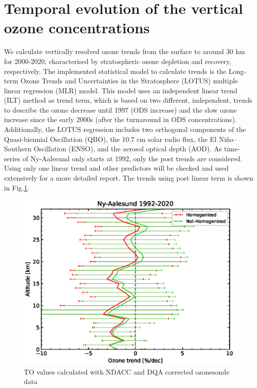 \documentclass{article}
\begin{document}
    \section{Temporal evolution of the vertical ozone concentrations}
    We calculate vertically resolved ozone trends from the surface to around 30 km for
2000-2020, characterised by stratospheric ozone depletion and recovery, respectively.
    The implemented statistical model to calculate trends is the Long-term Ozone Trends and Uncertainties
    in the Stratosphere (LOTUS) multiple linear regression (MLR) model. This model
uses an independent linear trend (ILT) method as trend term,
which is based on two different, independent, trends to describe the ozone decrease until 1997 (ODS increase) and
the slow ozone increase since the early 2000s (after the
turnaround in ODS concentrations). Additionally, the
LOTUS regression includes two orthogonal components of
the Quasi-biennial Oscillation (QBO), the 10.7 cm solar radio flux, the El Niño–Southern Oscillation (ENSO),
and the aerosol optical depth (AOD). As time-series of Ny-Aalesund only starts at 1992, only the post trends are considered.
    Using only one linear trend and other predictors will be checked and used extensively for a more detailed report.
    The trends using post linear term is shown in  Fig.\ref{fig:trend1}.

                                    \begin{figure}
        \centering
\includegraphics[width=1.2\textwidth]{post_Trend_Ny-aalesund}
    \caption{TO values calculated with NDACC and DQA corrected ozonesonde data}
            \label{fig:trend1}
    \end{figure}
\end{document}
